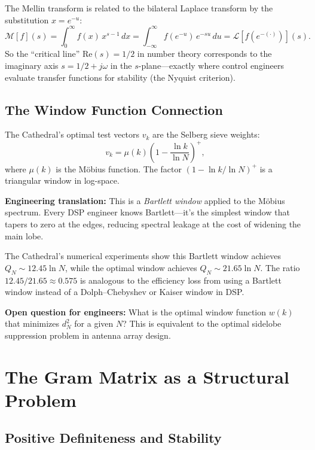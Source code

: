 \documentclass[11pt,a4paper]{article}
\begin{document}
The Mellin transform is related to the bilateral Laplace transform
by the substitution $x = e^{-u}$:
\[
  \mathcal{M}[f](s) = \int_0^\infty f(x)\,x^{s-1}\,dx
  = \int_{-\infty}^{\infty} f(e^{-u})\,e^{-su}\,du
  = \mathcal{L}[f(e^{-(\cdot)})](s).
\]
So the ``critical line'' $\mathrm{Re}(s) = 1/2$ in number theory
corresponds to the imaginary axis $s = 1/2 + j\omega$ in the
$s$-plane---exactly where control engineers evaluate transfer
functions for stability (the Nyquist criterion).

\subsection{The Window Function Connection}

The Cathedral's optimal test vectors $v_k$ are the Selberg sieve
weights:
\[
  v_k = \mu(k)\left(1 - \frac{\ln k}{\ln N}\right)^+,
\]
where $\mu(k)$ is the M\"obius function. The factor
$(1 - \ln k / \ln N)^+$ is a triangular window in log-space.

\textbf{Engineering translation:} This is a \emph{Bartlett window}
applied to the M\"obius spectrum. Every DSP engineer knows
Bartlett---it's the simplest window that tapers to zero at the
edges, reducing spectral leakage at the cost of widening the main
lobe.

The Cathedral's numerical experiments show this Bartlett window
achieves $Q_N \sim 12.45 \ln N$, while the optimal window achieves
$Q_N \sim 21.65 \ln N$. The ratio $12.45 / 21.65 \approx 0.575$
is analogous to the efficiency loss from using a Bartlett window
instead of a Dolph--Chebyshev or Kaiser window in DSP.

\textbf{Open question for engineers:} What is the optimal window
function $w(k)$ that minimizes $d_N^2$ for a given $N$? This is
equivalent to the optimal sidelobe suppression problem in antenna
array design.

\section{The Gram Matrix as a Structural Problem}
\label{sec:structural}

\subsection{Positive Definiteness and Stability}
\end{document}
